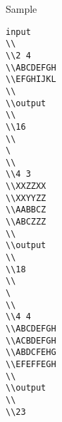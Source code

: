 Sample
\begin{verbatim}
input 
\\ 
\\2 4 
\\ABCDEFGH 
\\EFGHIJKL 
\\ 
\\output 
\\ 
\\16
\\
\ 
\\ 
\\4 3 
\\XXZZXX 
\\XXYYZZ 
\\AABBCZ 
\\ABCZZZ 
\\ 
\\output 
\\ 
\\18
\\
\ 
\\ 
\\4 4 
\\ABCDEFGH 
\\ACBDEFGH 
\\ABDCFEHG 
\\EFEFFEGH 
\\ 
\\output 
\\ 
\\23\end{verbatim}